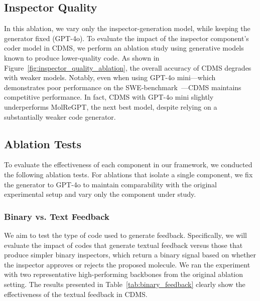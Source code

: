 \documentclass[10pt]{article} %
\begin{document}
    \subsection{Inspector Quality}

    In this ablation, we vary only the inspector-generation model, while keeping the generator fixed (GPT-4o). To evaluate the impact of the inspector component's coder model in CDMS, we perform an ablation study using generative models known to produce lower-quality code. As shown in Figure~\ref{fig:inspector_quality_ablation}, the overall accuracy of CDMS degrades with weaker models. Notably, even when using GPT-4o mini—which demonstrates poor performance on the SWE-benchmark~\cite{jimenez2024swebench}—CDMS maintains competitive performance. In fact, CDMS with GPT-4o mini slightly underperforms MolReGPT, the next best model, despite relying on a substantially weaker code generator.

    \subsection{Ablation Tests}
    \label{sec:ablation_tests}

    To evaluate the effectiveness of each component in our framework, we conducted the following ablation tests. For ablations that isolate a single component, we fix the generator to GPT-4o to maintain comparability with the original experimental setup and vary only the component under study.

    \subsubsection{Binary vs. Text Feedback}
    We aim to test the type of code used to generate feedback. Specifically, we will evaluate the impact of codes that generate textual feedback versus those that produce simpler binary inspectors, which return a binary signal based on whether the inspector approves or rejects the proposed molecule. We ran the experiment with two representative high-performing backbones from the original ablation setting. The results presented in Table~\ref{tab:binary_feedback} clearly show the effectiveness of the textual feedback in CDMS.
\end{document}
